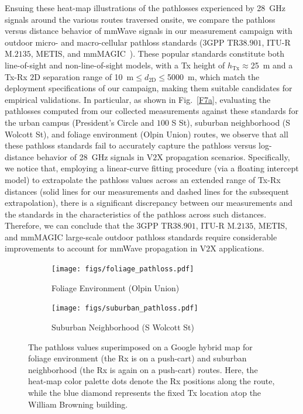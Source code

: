 \documentclass[10pt, twocolumn]{IEEEtran}
\begin{document}
{Ensuing these heat-map illustrations of the pathlosses experienced by \SI{28}{\giga\hertz} signals around the various routes traversed onsite, we compare the pathloss versus distance behavior of mmWave signals in our measurement campaign with outdoor micro- and macro-cellular pathloss standards ($3$GPP TR$38.901$, ITU-R M$.2135$, METIS, and mmMAGIC~\cite{MacCartneyModelsOverview}). These popular standards constitute both line-of-sight and non-line-of-sight models, with a Tx height of $h_{\text{Tx}}{\approx}$\SI{25}{\meter} and a Tx-Rx $2$D separation range of \SI{10}{\meter}${\leq}d_{2\text{D}}{\leq}$\SI{5000}{\meter}, which match the deployment specifications of our campaign, making them suitable candidates for empirical validations. In particular, as shown in Fig.~\ref{F7a}, evaluating the pathlosses computed from our collected measurements against these standards for the urban campus (President's Circle and $100$ S St), suburban neighborhood (S Wolcott St), and foliage environment (Olpin Union) routes, we observe that all these pathloss standards fail to accurately capture the pathloss versus log-distance behavior of \SI{28}{\giga\hertz} signals in V$2$X propagation scenarios. Specifically, we notice that, employing a linear-curve fitting procedure (via a floating intercept model) to extrapolate the pathloss values across an extended range of Tx-Rx distances (solid lines for our measurements and dashed lines for the subsequent extrapolation), there is a significant discrepancy between our measurements and the standards in the characteristics of the pathloss across such distances. Therefore, we can conclude that the $3$GPP TR$38.901$, ITU-R M$.2135$, METIS, and mmMAGIC large-scale outdoor pathloss standards require considerable improvements to account for mmWave propagation in V$2$X applications.
\begin{figure} [t]
    \centering
    \begin{subfigure}{0.5565\linewidth}
        \centering
        \texttt{[image: figs/foliage\_pathloss.pdf]}
        \caption{Foliage Environment (Olpin Union)}
        \label{F6a}
    \end{subfigure}
    \begin{subfigure}{0.4335\linewidth}
        \centering
        \texttt{[image: figs/suburban\_pathloss.pdf]}
        \caption{Suburban Neighborhood (S Wolcott St)}
        \label{F6b}
    \end{subfigure}
    \vspace{-8mm}
    \caption{The pathloss values superimposed on a Google hybrid map for foliage environment (the Rx is on a push-cart) and suburban neighborhood (the Rx is again on a push-cart) routes. Here, the heat-map color palette dots denote the Rx positions along the route, while the blue diamond represents the fixed Tx location atop the William Browning building.}
    \label{F6}
\end{figure}

}
\end{document}
